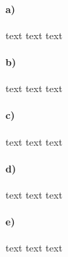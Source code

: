 \paragraph{a)}
text text text

\paragraph{b)}
text text text

\paragraph{c)}
text text text

\paragraph{d)}
text text text

\paragraph{e)}
text text text
